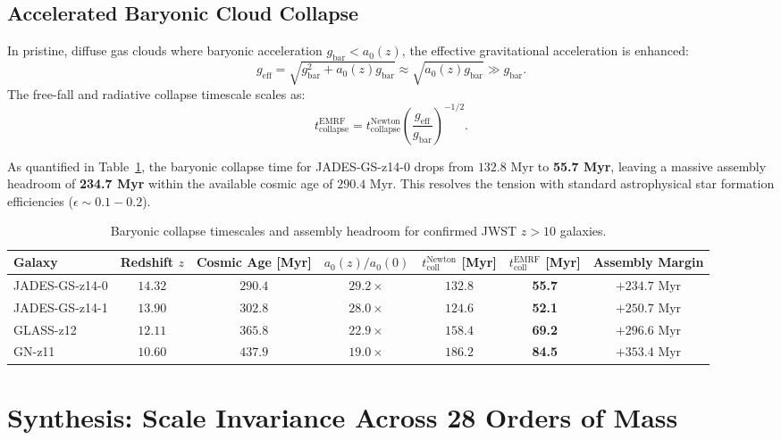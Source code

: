 \documentclass[11pt,a4paper]{article}
\begin{document}
\subsection{Accelerated Baryonic Cloud Collapse}
In pristine, diffuse gas clouds where baryonic acceleration $g_{\text{bar}} < a_0(z)$, the effective gravitational acceleration is enhanced:
\begin{equation}
g_{\text{eff}} = \sqrt{g_{\text{bar}}^2 + a_0(z) g_{\text{bar}}} \approx \sqrt{a_0(z) g_{\text{bar}}} \gg g_{\text{bar}}.
\end{equation}
The free-fall and radiative collapse timescale scales as:
\begin{equation}
t_{\text{collapse}}^{\text{EMRF}} = t_{\text{collapse}}^{\text{Newton}} \left(\frac{g_{\text{eff}}}{g_{\text{bar}}}\right)^{-1/2}.
\end{equation}

As quantified in Table~\ref{tab:jwst}, the baryonic collapse time for JADES-GS-z14-0 drops from $132.8\text{ Myr}$ to \textbf{55.7 Myr}, leaving a massive assembly headroom of \textbf{234.7 Myr} within the available cosmic age of $290.4\text{ Myr}$. This resolves the tension with standard astrophysical star formation efficiencies ($\epsilon \sim 0.1-0.2$).

\begin{table}[htbp]
\centering
\small
\caption{Baryonic collapse timescales and assembly headroom for confirmed JWST $z > 10$ galaxies.}
\label{tab:jwst}
\begin{tabular}{lcccccc}
\toprule
Galaxy & Redshift $z$ & Cosmic Age [Myr] & $a_0(z)/a_0(0)$ & $t_{\text{coll}}^{\text{Newton}}$ [Myr] & $t_{\text{coll}}^{\text{EMRF}}$ [Myr] & Assembly Margin \\
\midrule
JADES-GS-z14-0 & $14.32$ & $290.4$ & $29.2\times$ & $132.8$ & \textbf{55.7} & $+234.7\text{ Myr}$ \\
JADES-GS-z14-1 & $13.90$ & $302.8$ & $28.0\times$ & $124.6$ & \textbf{52.1} & $+250.7\text{ Myr}$ \\
GLASS-z12 & $12.11$ & $365.8$ & $22.9\times$ & $158.4$ & \textbf{69.2} & $+296.6\text{ Myr}$ \\
GN-z11 & $10.60$ & $437.9$ & $19.0\times$ & $186.2$ & \textbf{84.5} & $+353.4\text{ Myr}$ \\
\bottomrule
\end{tabular}
\end{table}

\section{Synthesis: Scale Invariance Across 28 Orders of Mass}
\end{document}
